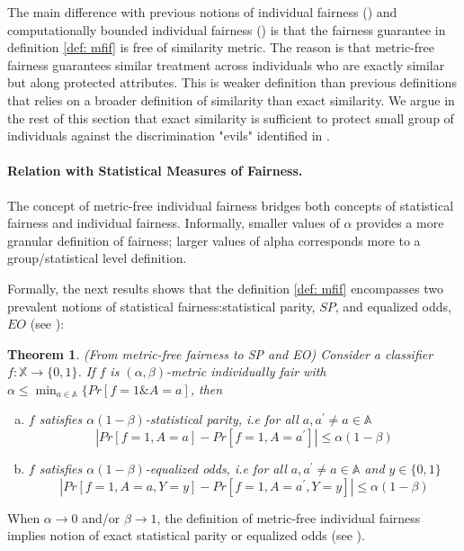 \documentclass{article}
\newtheorem{thm}{Theorem}[section]
\begin{document}
 \bigskip
 The main difference with previous notions of individual fairness (\cite{dwork2012fairness}) and computationally bounded individual fairness (\cite{kim2018fairness}) is that the fairness guarantee in definition \ref{def: mfif} is free of similarity metric.  The reason is that metric-free fairness guarantees similar treatment across individuals who are exactly similar but along protected attributes. This is weaker definition than previous definitions that relies on a broader definition of similarity than exact similarity.  We argue in the rest of this section that exact similarity is sufficient to protect small group of individuals against the discrimination "evils" identified in \cite{dwork2012fairness}. 


\paragraph{Relation with Statistical Measures of Fairness.}
The concept of metric-free individual fairness bridges both concepts of statistical fairness and individual fairness.  Informally, smaller values of $\alpha$ provides a more granular definition of fairness; larger values of alpha corresponds more to a group/statistical level definition. 

\bigskip
Formally, the next results shows that the definition \ref{def: mfif} encompasses two prevalent notions of statistical fairness:statistical parity, $SP$, and equalized odds, $EO$ (see \cite{hardt2016equality}):

\begin{thm}(From metric-free fairness to SP and EO)
\label{thm: SP}
Consider a classifier $f: \mathbb{X} \rightarrow \{0, 1\}$.  If $f$ is $(\alpha,\beta)$-metric individually fair with $\alpha \leq \min_{a\in \mathbb{A}}\{Pr[f=1 \& A=a]$, then 
\begin{enumerate}[(a)]
    \item $f$ satisfies $\alpha(1-\beta)$-statistical parity, i.e for all $a, a^{'}\neq a \in \mathbb{A}$
$$ |Pr[f=1, A=a] - Pr[f=1, A=a^{'}]| \leq \alpha(1-\beta)$$
    \item $f$ satisfies $\alpha(1-\beta)$-equalized odds, i.e for all $a, a^{'}\neq a \in \mathbb{A}$ and $y\in\{0,1\}$
$$ |Pr[f=1, A=a, Y=y] - Pr[f=1, A=a^{'}, Y=y]| \leq \alpha(1-\beta)$$
\end{enumerate}
\end{thm}

When $\alpha \rightarrow 0$ and/or $\beta\rightarrow 1$, the definition of metric-free individual fairness implies notion of  exact statistical parity or equalized odds (see \cite{hardt2016equality}).
\end{document}
